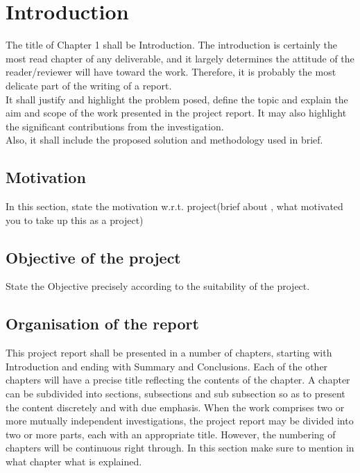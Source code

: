 \chapter{Introduction}

The title of Chapter 1 shall be Introduction. The introduction is certainly the most read chapter of any deliverable, and it largely determines the attitude of the reader/reviewer will have toward the work. Therefore, it is probably the most delicate part of the writing of a report.\\
It shall justify and highlight the problem posed, define the topic and explain the aim and scope of the work presented in the project report. It may also highlight the significant contributions from the investigation.\\
Also, it shall include the proposed solution and methodology used in brief.\\

\section{Motivation}

In this section, state the motivation w.r.t. project(brief about , what motivated you to take up this as a project) \\

\section{Objective of the project}

State the Objective precisely according to the suitability of the project.\\

\section{Organisation of the report}
This project report shall be presented in a number of chapters, starting with Introduction and ending with Summary and Conclusions. Each of the other chapters will have a precise title reflecting the contents of the chapter. A chapter can be subdivided into sections, subsections and sub subsection so as to present the content discretely and with due emphasis. When the work comprises two or more mutually independent investigations, the project report may be divided into two or more parts, each with an appropriate title. However, the numbering of chapters will be continuous right through. In this section make sure to mention in what chapter what is explained.